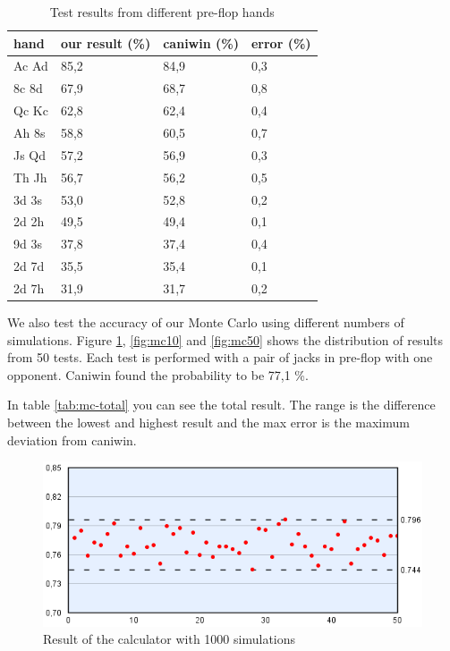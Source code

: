 \vspace{4mm}
\def\arraystretch{1.5}
\begin{table}
  \center
  \begin{tabular}{ | l | l | l | l | }
  	\hline
  	hand & our result (\%) & caniwin (\%) & error (\%) \\
  	\hline                       
    Ac Ad & 85,2 & 84,9 & 0,3 \\
    8c 8d & 67,9 & 68,7 & 0,8 \\
    Qc Kc & 62,8 & 62,4 & 0,4 \\
    Ah 8s & 58,8 & 60,5 & 0,7 \\
    Js Qd & 57,2 & 56,9 & 0,3 \\
    Th Jh & 56,7 & 56,2 & 0,5 \\
    3d 3s & 53,0 & 52,8 & 0,2 \\
    2d 2h & 49,5 & 49,4 & 0,1 \\
    9d 3s & 37,8 & 37,4 & 0,4 \\
    2d 7d & 35,5 & 35,4 & 0,1 \\
    2d 7h & 31,9 & 31,7 & 0,2 \\
  	\hline   	
  \end{tabular}
  \caption{Test results from different pre-flop hands \label{tab:pre-flop-test}}
\end{table}
\vspace{4mm}

We also test the accuracy of our Monte Carlo using different numbers of simulations. Figure \ref{fig:mc1}, \ref{fig:mc10} and \ref{fig:mc50} shows the distribution of results from 50 tests. Each test is performed with a pair of jacks in pre-flop with one opponent. Caniwin found the probability to be 77,1 \%. 

In table \ref{tab:mc-total} you can see the total result. The range is the difference between the lowest and highest result and the max error is the maximum deviation from caniwin. 

\begin{figure}
  \center
    \includegraphics[scale=0.775]{images/MonteCarlo/1k.png}
  \caption{Result of the calculator with 1000 simulations \label{fig:mc1}}
\end{figure}

